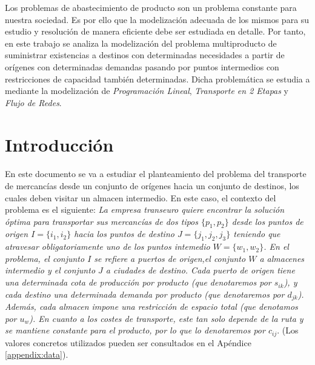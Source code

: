 \documentclass[a4paper, spanish]{article}
\begin{document}
  \maketitle

  \abstract \noindent Los problemas de abastecimiento de producto son un problema constante para nuestra sociedad. Es por ello que la modelización adecuada de los mismos para su estudio y resolución de manera eficiente debe ser estudiada en detalle. Por tanto, en este trabajo se analiza la modelización del problema multiproducto de suministrar existencias a destinos con determinadas necesidades a partir de orígenes con determinadas demandas pasando por puntos intermedios con restricciones de capacidad también determinadas. Dicha problemática se estudia a mediante la modelización de \emph{Programación Lineal}, \emph{Transporte en 2 Etapas} y \emph{Flujo de Redes}.


  \section{Introducción}

    \paragraph{}
    En este documento se va a estudiar el planteamiento del problema del transporte de mercancías desde un conjunto de orígenes hacia un conjunto de destinos, los cuales deben visitar un almacen intermedio. En este caso, el contexto del problema es el siguiente: \emph{La empresa transeuro quiere encontrar la solución óptima para transportar sus mercancías de dos tipos $\{p_1, p_2\}$ desde los puntos de origen $I = \{i_1, i_2\}$ hacia los puntos de destino $J = \{j_1, j_2, j_3\}$ teniendo que atravesar obligatoriamente uno de los puntos intemedio $W =\{w_1, w_2\}$. En el problema, el conjunto $I$ se refiere a puertos de origen,el conjunto $W$ a almacenes intermedio y el conjunto $J$ a ciudades de destino. Cada puerto de origen tiene una determinada cota de producción por producto (que denotaremos por $s_{ik}$), y cada destino una determinada demanda por producto (que denotaremos por $d_{jk}$). Además, cada almacen impone una restricción de espacio total (que denotamos por $u_{w}$). En cuanto a los costes de transporte, este tan solo depende de la ruta y se mantiene constante para el producto, por lo que lo denotaremos por $c_{ij}$}. (Los valores concretos utilizados pueden ser consultados en el Apéndice \ref{appendix:data}).
\end{document}
